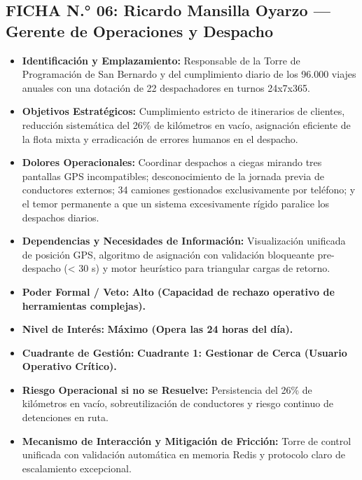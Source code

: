 \subsection*{FICHA N.° 06: Ricardo Mansilla Oyarzo — Gerente de Operaciones y Despacho}
\begin{itemize}
\item \textbf{Identificación y Emplazamiento:} Responsable de la Torre de Programación de San Bernardo y del cumplimiento diario de los 96.000 viajes anuales con una dotación de 22 despachadores en turnos 24x7x365.
\item \textbf{Objetivos Estratégicos:} Cumplimiento estricto de itinerarios de clientes, reducción sistemática del 26\% de kilómetros en vacío, asignación eficiente de la flota mixta y erradicación de errores humanos en el despacho.
\item \textbf{Dolores Operacionales:} Coordinar despachos a ciegas mirando tres pantallas GPS incompatibles; desconocimiento de la jornada previa de conductores externos; 34 camiones gestionados exclusivamente por teléfono; y el temor permanente a que un sistema excesivamente rígido paralice los despachos diarios.
\item \textbf{Dependencias y Necesidades de Información:} Visualización unificada de posición GPS, algoritmo de asignación con validación bloqueante pre-despacho (< 30 s) y motor heurístico para triangular cargas de retorno.
\item \textbf{Poder Formal / Veto:} \textbf{Alto (Capacidad de rechazo operativo de herramientas complejas).}
\item \textbf{Nivel de Interés:} \textbf{Máximo (Opera las 24 horas del día).}
\item \textbf{Cuadrante de Gestión:} \textbf{Cuadrante 1: Gestionar de Cerca (Usuario Operativo Crítico).}
\item \textbf{Riesgo Operacional si no se Resuelve:} Persistencia del 26\% de kilómetros en vacío, sobreutilización de conductores y riesgo continuo de detenciones en ruta.
\item \textbf{Mecanismo de Interacción y Mitigación de Fricción:} Torre de control unificada con validación automática en memoria Redis y protocolo claro de escalamiento excepcional.
\end{itemize}
